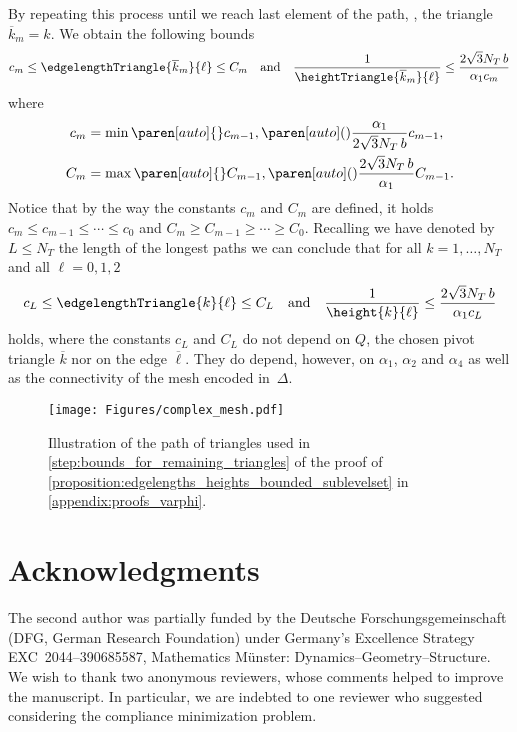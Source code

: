 By repeating this process until we reach last element of the path, \ie, the triangle~$\overline{k}_m = k$.
We obtain the following bounds
\begin{equation*}
	c_m
	\le
	\edgelengthTriangle{\overline{k}_m}{\ell}
	\le
	C_m
	\quad
	\text{and}
	\quad
	\frac{1}{\heightTriangle{\overline{k}_m}{\ell}}
	\le
	\frac{2\sqrt{3}N_T \, b}{\alpha_1 c_m}
\end{equation*}
where
\begin{align*}
	c_m
	&
	=
	\min
	\paren[auto]\{\}{
		c_{m-1}
		,
		\paren[auto](){
			\frac{\alpha_1}{2\sqrt{3}N_T \, b}
		}
		c_{m-1}
	}
	,
	\\
	C_m
	&
	=
	\max
	\paren[auto]\{\}{
		C_{m-1}
		,
		\paren[auto](){
			\frac{2\sqrt{3}N_T \, b }{\alpha_1}
		}
		C_{m-1}
	}
	.
\end{align*}
Notice that by the way the constants $c_m$ and $C_m$ are defined, it holds $c_m \le c_{m-1} \le \cdots \le c_0$ and $C_m \geq C_{m-1}\geq \cdots \geq C_0$.
Recalling we have denoted by $L\le N_T$ the length of the longest paths we can conclude that for all $k = 1,\ldots, N_T$ and all $\ell = 0,1,2$
\begin{equation*}
	c_L
	\le
	\edgelengthTriangle{k}{\ell}
	\le
	C_L
	\quad
	\text{and}
	\quad
	\frac{1}{\height{k}{\ell}}
	\le
	\frac{2\sqrt{3} N_T \, b}{\alpha_1 c_L}
\end{equation*}
holds, where the constants $c_L$ and $C_L$ do not depend on $Q$, the chosen pivot triangle $\overline{k}$ nor on the edge $\overline{\ell}$.
They do depend, however, on $\alpha_1$, $\alpha_2$ and $\alpha_4$ as well as the connectivity of the mesh encoded in~$\Delta.$

\begin{figure}[htp]
	\centering
	\texttt{[image: Figures/complex\_mesh.pdf]}
	\caption{Illustration of the path of triangles used in \cref{step:bounds_for_remaining_triangles} of the proof of \cref{proposition:edgelengths_heights_bounded_sublevelset} in \cref{appendix:proofs_varphi}.}
	\label{fig:bounded_edgelengths_heights_complex_mesh}
\end{figure}


\section*{Acknowledgments}

The second author was partially funded by the Deutsche Forschungsgemeinschaft (DFG, German Research Foundation) under Germany's Excellence Strategy EXC~2044--390685587, Mathematics Münster: Dynamics--Geometry--Structure.
We wish to thank two anonymous reviewers, whose comments helped to improve the manuscript.
In particular, we are indebted to one reviewer who suggested considering the compliance minimization problem.
